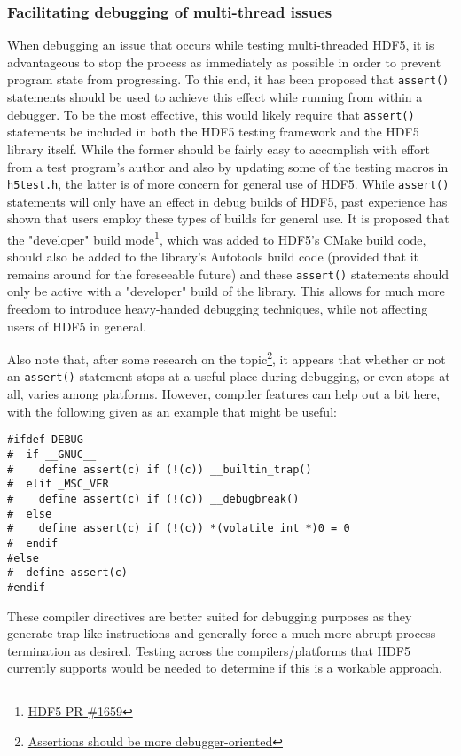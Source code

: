 \documentclass[../HDF5_RFC.tex]{subfiles}
\begin{document}
\subsubsection{Facilitating debugging of multi-thread issues}

When debugging an issue that occurs while testing multi-threaded HDF5, it is advantageous to stop the
process as immediately as possible in order to prevent program state from progressing. To this end, it
has been proposed that \texttt{assert()} statements should be used to achieve this effect while running
from within a debugger. To be the most effective, this would likely require that \texttt{assert()}
statements be included in both the HDF5 testing framework and the HDF5 library itself. While the former
should be fairly easy to accomplish with effort from a test program's author and also by updating some
of the testing macros in \texttt{h5test.h}, the latter is of more concern for general use of HDF5. While \texttt{assert()} statements will only have an effect in debug builds of HDF5, past experience has shown
that users employ these types of builds for general use. It is proposed that the "developer" build mode\footnote{\href{https://github.com/HDFGroup/hdf5/pull/1659}{HDF5 PR \#1659}}, which was added to
HDF5's CMake build code, should also be added to the library's Autotools build code (provided that it
remains around for the foreseeable future) and these \texttt{assert()} statements should only be active
with a "developer" build of the library. This allows for much more freedom to introduce heavy-handed
debugging techniques, while not affecting users of HDF5 in general.

Also note that, after some research on the topic\footnote{\href{https://nullprogram.com/blog/2022/06/26/}{Assertions should be more debugger-oriented}}, it appears that whether or not an \texttt{assert()} statement stops at a useful place during debugging, or even stops at all, varies among platforms. However, compiler features can help out a bit here, with the following given as an example that might be useful:

\begin{verbatim}
#ifdef DEBUG
#  if __GNUC__
#    define assert(c) if (!(c)) __builtin_trap()
#  elif _MSC_VER
#    define assert(c) if (!(c)) __debugbreak()
#  else
#    define assert(c) if (!(c)) *(volatile int *)0 = 0
#  endif
#else
#  define assert(c)
#endif
\end{verbatim}

These compiler directives are better suited for debugging purposes as they generate trap-like instructions and
generally force a much more abrupt process termination as desired. Testing across the compilers/platforms that
HDF5 currently supports would be needed to determine if this is a workable approach.
\end{document}
